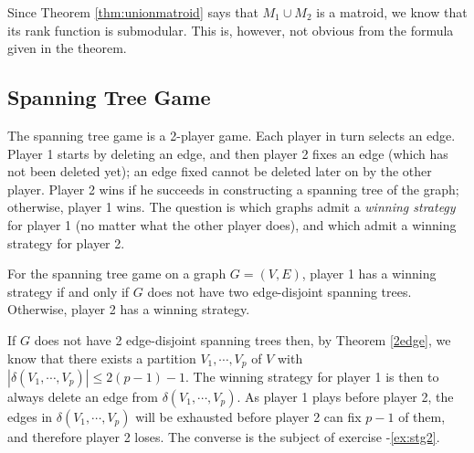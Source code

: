 \documentclass[12pt]{article}
\begin{document}
Since Theorem \ref{thm:unionmatroid} says that $M_1\cup M_2$ is a
matroid, we know that its rank function is submodular. This is,
however, not obvious from the formula given in the theorem. 

\subsection{Spanning Tree Game}
The spanning tree game is a
2-player game. Each player in turn selects an edge. Player 1 starts by
deleting an edge, and then player 2 fixes an edge (which has not been
deleted yet); an edge fixed
cannot be deleted later on by the other player. Player 2 wins if he
succeeds in constructing a spanning tree of the graph; otherwise,
player 1 wins. The question is which graphs admit a {\it winning
  strategy} for player 1 (no matter what the other player does), and
which admit a winning strategy for player 2.

\begin{theorem}
For the spanning tree game on a graph $G=(V,E)$, player 1 has a
winning strategy if and only if $G$ does not have two edge-disjoint
spanning trees. Otherwise, player 2 has a winning strategy. 
\end{theorem}

If $G$ does not have 2 edge-disjoint spanning trees then, by Theorem
\ref{2edge}, we know that there exists a partition $V_1, \cdots, V_p$
of $V$ with $ |\delta(V_1, \cdots, V_p)|\leq 2(p-1)-1.$ The winning
strategy for player 1 is then to always delete an edge from
$\delta(V_1, \cdots, V_p)$. As player 1 plays before player 2, the
edges in $\delta(V_1, \cdots, V_p)$ will be exhausted before player 2
can fix $p-1$ of them, and therefore player 2 loses. The converse is
the subject of exercise -\ref{ex:stg2}.
\end{document}
